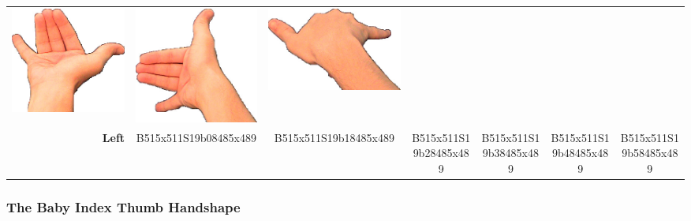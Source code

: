 \documentclass{article}
\begin{document}
\begin{center}
\begin{tabular}{r*{6}{c}}
\includegraphics[scale=0.1]{images/06-08-4.jpg}&
\includegraphics[scale=0.1]{images/06-08-5.jpg}&
\includegraphics[scale=0.1]{images/06-08-6.jpg}\\
\textbf{Left}&
B515x511S19b08485x489&
B515x511S19b18485x489&
B515x511S19b28485x489&
B515x511S19b38485x489&
B515x511S19b48485x489&
B515x511S19b58485x489\\
\end{tabular}
\end{center}

\subsubsection{The Baby Index Thumb Handshape}
\end{document}
